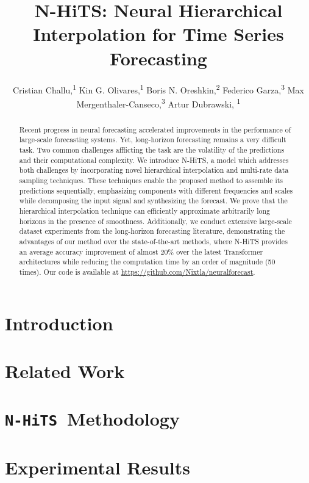 \documentclass[letterpaper]{article} %
\title{N-HiTS: Neural Hierarchical Interpolation for Time Series Forecasting}
\author{
    Cristian Challu,\textsuperscript{\rm 1}\equalcontrib
    Kin G. Olivares,\textsuperscript{\rm 1}\equalcontrib
    Boris N. Oreshkin,\textsuperscript{\rm 2}
    Federico Garza,\textsuperscript{\rm 3}
    Max Mergenthaler-Canseco,\textsuperscript{\rm 3}
    Artur Dubrawski, \textsuperscript{\rm 1}
}
\newcommand{\model}[1]{\texttt{#1}}
\newcommand{\ours}{\model{{N-HiTS}}}
\begin{document}
\maketitle

\begin{abstract}
Recent progress in neural forecasting accelerated improvements in the performance of large-scale forecasting systems. Yet, long-horizon forecasting remains a very difficult task. Two common challenges afflicting the task are the volatility of the predictions and their computational complexity. We introduce N-HiTS, a model which addresses both challenges by incorporating novel hierarchical interpolation and multi-rate data sampling techniques. These techniques enable the proposed method to assemble its predictions sequentially, emphasizing components with different frequencies and scales while decomposing the input signal and synthesizing the forecast. We prove that the hierarchical interpolation technique can efficiently approximate arbitrarily long horizons in the presence of smoothness. 
Additionally, we conduct extensive large-scale dataset experiments from the long-horizon forecasting literature, demonstrating the advantages of our method over the state-of-the-art methods, where N-HiTS provides an average accuracy improvement of almost 20\% over the latest Transformer architectures while reducing the computation time by an order of magnitude (50 times). Our code is available at \url{https://github.com/Nixtla/neuralforecast}.
\end{abstract}

\section{Introduction} \label{section1:introduction}


\section{Related Work} \label{section2:literature}


\section{\ours\ Methodology} \label{section3:model}


\section{Experimental Results} \label{section4:experiments}



\end{document}
